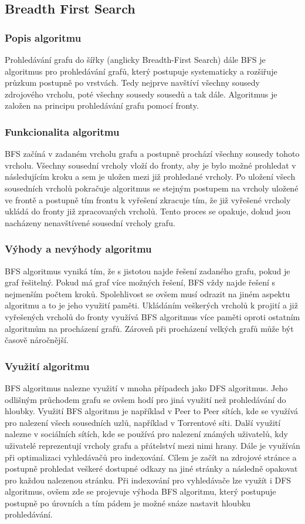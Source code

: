 \documentclass[12pt, titlepage, a4paper]{article}
\begin{document}
\subsection{Breadth First Search}
\subsubsection{Popis algoritmu}
Prohledávání grafu do šířky (anglicky Breadth-First Search) dále BFS je algoritmus 
pro prohledávání grafů, který postupuje systematicky a rozšiřuje průzkum postupně po 
vrstvách. Tedy nejprve navštíví všechny sousedy zdrojového vrcholu, poté všechny sousedy 
sousedů a tak dále. Algoritmus je založen na principu prohledávání grafu pomocí fronty.
~\cite{GeeksforGeeks: BFS,Brilliant: BFS}
\subsubsection{Funkcionalita algoritmu}
BFS začíná v zadaném vrcholu grafu a postupně prochází všechny sousedy tohoto vrcholu. 
Všechny sousední vrcholy vloží do fronty, aby je bylo možné prohledat v následujícím kroku 
a sem je uložen mezi již prohledané vrcholy. Po uložení všech sousedních vrcholů pokračuje 
algoritmus se stejným postupem na vrcholy uložené ve frontě a postupně tím frontu k vyřešení 
zkracuje tím, že již vyřešené vrcholy ukládá do fronty již zpracovaných vrcholů. Tento proces 
se opakuje, dokud jsou nacházeny nenavštívené sousední vrcholy grafu.
~\cite{GeeksforGeeks: BFS,Brilliant: BFS}
\subsubsection{Výhody a nevýhody algoritmu}
BFS algoritmus vyniká tím, že s jistotou najde řešení zadaného grafu, pokud je graf řešitelný.
Pokud má graf více možných řešení, BFS vždy najde řešení s nejmenším počtem kroků. Spolehlivost 
se ovšem musí odrazit na jiném aspektu algoritmu a to je jeho využití paměti. Ukládáním veškerých 
vrcholů k projití a již vyřešených vrcholů do fronty využívá BFS algoritmus více paměti oproti ostatním algoritmům
na procházení grafů. Zároveň při procházení velkých grafů může být časově náročnější.

\subsubsection{Využití algoritmu}
BFS algoritmus nalezne využití v mnoha případech jako DFS algoritmus. Jeho odlišným průchodem grafu se ovšem hodí 
pro jiná využití než prohledávání do hloubky. Využití BFS algoritmu je například v Peer to Peer sítích, kde se 
využívá pro nalezení všech sousedních uzlů, například v Torrentové síti. Další využití nalezne v sociálních sítích,
kde se používá pro nalezení známých uživatelů, kdy uživatelé reprezentují vrcholy grafu a přátelství mezi nimi hrany.
Dále je využíván při optimalizaci vyhledávačů pro indexování. Cílem je začít na zdrojové stránce a postupně prohledat 
veškeré dostupné odkazy na jiné stránky a následně opakovat pro každou nalezenou stránku. Při indexování pro vyhledávače 
lze využít i DFS algoritmus, ovšem zde se projevuje výhoda BFS algoritmu, který postupuje postupně po úrovních a tím pádem 
je možné snáze nastavit hloubku prohledávání.
\end{document}
